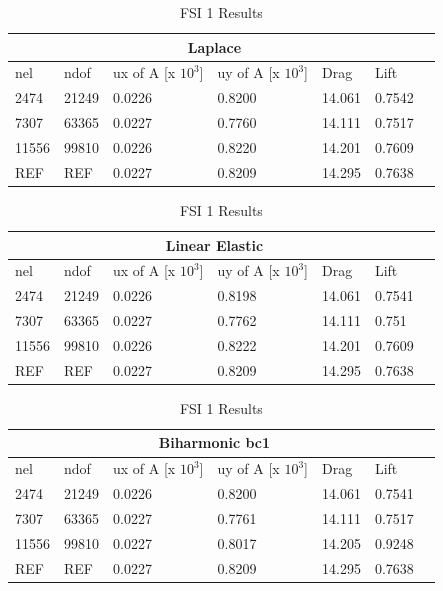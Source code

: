 \begin{table}[h!]
\centering
\caption{FSI 1 Results}
\label{FSI1 Results}
\begin{tabular}{ |p{1cm}||p{1cm}|p{2.5cm}|p{2.5cm}|p{2.7cm}|p{2.7cm}|p{1.2cm}|}
 \hline
  \multicolumn{6}{|c|}{Laplace} \\
   \hline
nel & ndof & ux of A [x $10^{3}$]  &uy of A [x $10^{3}$]& Drag  & Lift \\
 \hline
 2474    & 21249  &       0.0226 &       0.8200 & 14.061 & 0.7542 \\
 7307    & 63365  &       0.0227 &       0.7760 & 14.111 & 0.7517 \\
 11556   & 99810  &       0.0226 &      0.8220 & 14.201 & 0.7609 \\
  \hline 
 REF     & REF    &       0.0227      &       0.8209      & 14.295  & 0.7638   \\
 \hline
\end{tabular}
\begin{tabular}{ |p{1cm}||p{1cm}|p{2.5cm}|p{2.5cm}|p{2.7cm}|p{2.7cm}|p{1.2cm}|}
 \hline
  \multicolumn{6}{|c|}{Linear Elastic} \\
   \hline
nel & ndof & ux of A [x $10^{3}$]  &uy of A [x $10^{3}$]& Drag  & Lift \\
 \hline
 2474    & 21249  &       0.0226 &       0.8198 & 14.061 & 0.7541 \\
 7307    & 63365  &       0.0227 &       0.7762 & 14.111 & 0.751  \\
 11556   & 99810  &       0.0226  &       0.8222 & 14.201 & 0.7609 \\
  \hline 
 REF     & REF    &       0.0227      &       0.8209      & 14.295  & 0.7638   \\
 \hline
\end{tabular}
\begin{tabular}{ |p{1cm}||p{1cm}|p{2.5cm}|p{2.5cm}|p{2.7cm}|p{2.7cm}|p{1.2cm}|}
 \hline
  \multicolumn{6}{|c|}{Biharmonic bc1} \\
   \hline
nel & ndof & ux of A [x $10^{3}$]  &uy of A [x $10^{3}$]& Drag  & Lift \\
 \hline
 2474    & 21249  &       0.0226 &       0.8200 & 14.061 & 0.7541 \\
 7307    & 63365  &       0.0227  &       0.7761 & 14.111 & 0.7517 \\
 11556   & 99810  &       0.0227  &       0.8017 & 14.205 & 0.9248 \\
  \hline 
 REF     & REF    &       0.0227      &       0.8209      & 14.295  & 0.7638   \\

\end{tabular}
\end{table}
